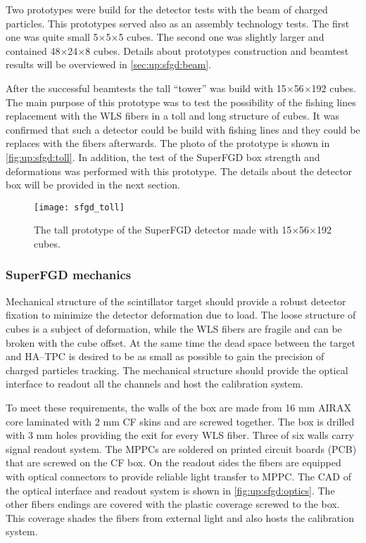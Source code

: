 \documentclass[main.tex]{subfiles}
\begin{document}
Two prototypes were build for the detector tests with the beam of charged particles. This prototypes served also as an assembly technology tests. The first one was quite small 5$\times$5$\times$5 cubes. The second one was slightly larger and contained 48$\times$24$\times$8 cubes. Details about prototypes construction and beamtest results will be overviewed in \autoref{sec:up:sfgd:beam}.

After the successful beamtests the tall ``tower'' was build with 15$\times$56$\times$192 cubes. The main purpose of this prototype was to test the possibility of the fishing lines replacement with the WLS fibers in a toll and long structure of cubes. It was confirmed that such a detector could be build with fishing lines and they could be replaces with the fibers afterwards. The photo of the prototype is shown in \autoref{fig:up:sfgd:toll}. In addition, the test of the SuperFGD box strength and deformations was performed with this prototype. The details about the detector box will be provided in the next section.

\begin{figure}[!ht]
	\centering
	\texttt{[image: sfgd\_toll]}
	\caption{The tall prototype of the SuperFGD detector made with 15$\times$56$\times$192 cubes.}
	\label{fig:up:sfgd:toll}
\end{figure}

\subsubsection{SuperFGD mechanics}
Mechanical structure of the scintillator target should provide a robust detector fixation to minimize the detector deformation due to load. The loose structure of cubes is a subject of deformation, while the WLS fibers are fragile and can be broken with the cube offset. At the same time the dead space between the target and HA--TPC is desired to be as small as possible to gain the precision of charged particles tracking. The mechanical structure should provide the optical interface to readout all the channels and host the calibration system.

To meet these requirements, the walls of the box are made from 16 mm AIRAX core laminated with 2 mm CF skins and are screwed together. The box is drilled with 3 mm holes providing the exit for every WLS fiber. Three of six walls carry signal readout system. The MPPCs are soldered on printed circuit boards (PCB) that are screwed on the CF box. On the readout sides the fibers are equipped with optical connectors to provide reliable light transfer to MPPC. The CAD of the optical interface and readout system is shown in \autoref{fig:up:sfgd:optics}. The other fibers endings are covered with the plastic coverage screwed to the box. This coverage shades the fibers from external light and also hosts the calibration system.
\end{document}
